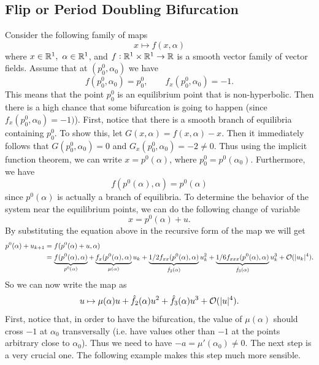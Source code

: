 \subsection{Flip or Period Doubling Bifurcation}
Consider the following family of maps
\[ x \mapsto f(x,\alpha) \]
where $x \in \mathbb{R}^1,\ \alpha \in \mathbb{R}^1$, and $f: \mathbb{R}^1\times\mathbb{R}^1 \to \mathbb{R}$ is a smooth vector family of vector fields. Assume that at $(p^0_0, \alpha_0)$ we have
\[ f(p_0^0, \alpha_0) = p_0^0, \qquad f_x(p_0^0, \alpha_0) = -1. \]
This means that the point $p_0^0$ is an equilibrium point that is non-hyperbolic. Then there is a high chance that some bifurcation is going to happen (since $f_x(p^0_0,\alpha_0)=-1)$). First, notice that there is a smooth branch of equilibria containing $p_0^0$. To show this, let $G(x,\alpha) = f(x,\alpha) - x$. Then it immediately follows that $G(p_0^0, \alpha_0) = 0$ and $G_x(p_0^0,\alpha_0) = -2 \neq 0$. Thus using the implicit function theorem, we can write $x = p^0(\alpha)$, where $p_0^0 = p^0(\alpha_0)$. Furthermore, we have
\[ f(p^0(\alpha),\alpha) = p^0(\alpha) \]
since $p^0(\alpha)$ is actually a branch of equilibria. To determine the behavior of the system near the equilibrium points, we can do the following change of variable
\[ x = p^0(\alpha) + u. \]
By substituting the equation above in the recursive form of the map we will get
\begin{align*}
	p^0(\alpha) + u_{k+1} &= f(p^0(\alpha)+u,\alpha) \\
	&= \underbrace{f(p^0(\alpha),\alpha)}_{p^0(\alpha)} + \underbrace{f_x(p^0(\alpha),\alpha)}_{\mu(\alpha)}u_k + \underbrace{1/2f_{xx}(p^0(\alpha),\alpha)}_{\hat{f}_2(\alpha)}u_k^2 + \underbrace{1/6f_{xxx}(p^0(\alpha),\alpha)}_{\hat{f}_3(\alpha)}u_k^3 + \mathcal{O}(|u_k|^4).
\end{align*}
So we can now write the map as
\[ u \mapsto \mu(\alpha)u + \hat{f}_2(\alpha)u^2 + \hat{f}_3(\alpha)u^3 + \mathcal{O}(|u|^4). \]
First, notice that, in order to have the bifurcation, the value of $\mu(\alpha)$ should cross $-1$ at $\alpha_0$ transversally (i.e. have values other than $-1$ at the points arbitrary close to $\alpha_0$). Thus we need to have $-a = \mu'(\alpha_0) \neq 0$. The next step is a very crucial one. The following example makes this step much more sensible.

